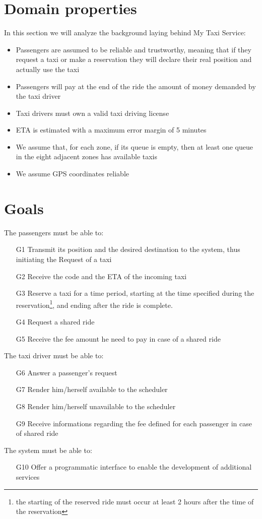 \section{Domain properties}
In this section we will analyze the background laying behind My Taxi Service:
\begin{itemize}
  \item Passengers are assumed to be reliable and trustworthy, meaning that if they request a taxi or make a reservation
  they will declare their real position and actually use the taxi
  \item Passengers will pay at the end of the ride the amount of money demanded by the taxi driver
  \item Taxi drivers must own a valid taxi driving license
  \item ETA is estimated with a maximum error margin of 5 minutes
  \item We assume that, for each zone, if its queue is empty, then at least one queue in the eight adjacent zones has available taxis
  \item We assume GPS coordinates reliable
\end{itemize}
\section{Goals}
The passengers must be able to:
\begin{itemize}
  \item [G1] Transmit its position and the desired destination to the system, thus initiating the Request of a taxi
  \item [G2] Receive the code and the ETA of the incoming taxi
  \item [G3] Reserve a taxi for a time period, starting at the time specified during the reservation\footnote{the starting of the
  reserved ride must occur at least 2 hours after the time of the reservation}, and ending after the ride is complete.
  \item [G4] Request a shared ride
  \item [G5] Receive the fee amount he need to pay in case of a shared ride %
\end{itemize}
The taxi driver must be able to:
\begin{itemize}
  \item [G6] Answer a passenger's request
  \item [G7] Render him/herself available to the scheduler
  \item [G8] Render him/herself unavailable to the scheduler
  \item [G9] Receive informations regarding the fee defined for each passenger in case of shared ride
\end{itemize}
The system must be able to:
\begin{itemize}
  \item [G10] Offer a programmatic interface to enable the development of additional services
\end{itemize}


